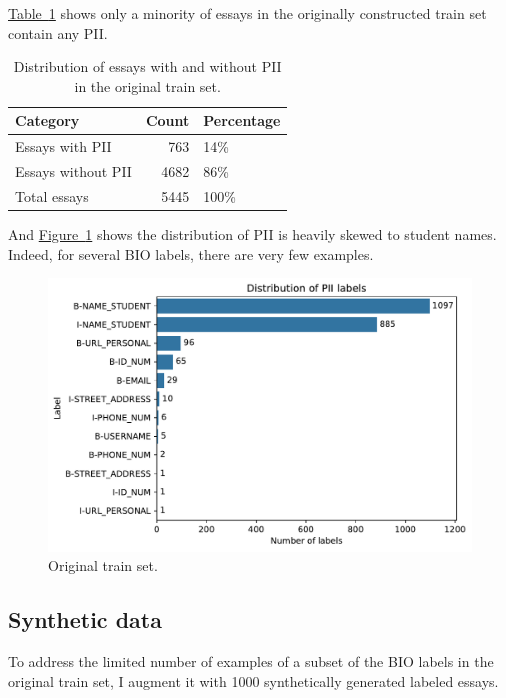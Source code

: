 \documentclass[11pt]{article}
\newcommand{\Tablink}[1]{\hyperref[#1]{Table~\ref*{#1}}}
\newcommand{\Figlink}[1]{\hyperref[#1]{Figure~\ref*{#1}}}
\begin{document}
\Tablink{tab:pii_distribution_original_train_set} shows only a minority of essays in the originally constructed train set contain any PII.

\begin{table}[h!]
  \centering
  \caption{Distribution of essays with and without PII in the original train set.}
  \label{tab:pii_distribution_original_train_set}
  \begin{tabular}{lrl}
  \toprule
            Category &  Count & Percentage \\
  \midrule
     Essays with PII &    763 &        14\% \\
  Essays without PII &   4682 &        86\% \\
        Total essays &   5445 &       100\% \\
  \bottomrule
  \end{tabular}
\end{table}

And \Figlink{fig:label_distribution_original_train_set} shows the distribution of PII is heavily skewed to student names. Indeed, for several BIO labels, there are very few examples.

\begin{figure}[H]
  \centering
  \includegraphics[width=\columnwidth]{images/label_distribution.pdf}
  \caption{Original train set.}
  \label{fig:label_distribution_original_train_set}
\end{figure}

\subsection{Synthetic data}

To address the limited number of examples of a subset of the BIO labels in the original train set, I augment it with 1000 synthetically generated labeled essays.
\end{document}
